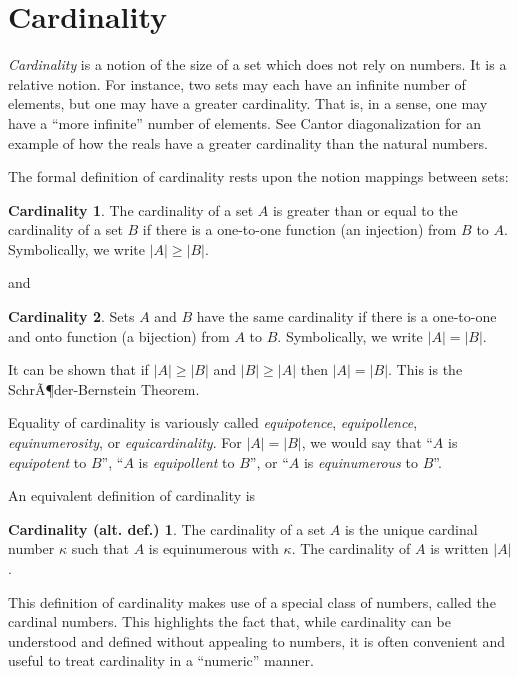 \documentclass[12pt]{article}
\theoremstyle{definition}
\newtheorem*{defn}{Cardinality}
\newtheorem*{altdefn}{Cardinality (alt. def.)}
\begin{document}
\section*{Cardinality}

\emph{Cardinality} is a notion of the size of a set which does not rely on numbers.  It is a relative notion.  For instance, two sets may each have an infinite number of elements, but one may have a greater cardinality.  That is, in a sense, one may have a ``more infinite'' number of elements.  See Cantor diagonalization for an example of how the reals have a greater cardinality than the natural numbers.

The formal definition of cardinality rests upon the notion mappings between sets:

\begin{defn}
The cardinality of a set $A$ is greater than or equal to 
the cardinality of a set $B$
if there is a one-to-one function (an injection) from $B$ to $A$.
Symbolically, we write $|A| \geq |B|$.
\end{defn}

and

\begin{defn}
Sets $A$ and $B$ have the same cardinality
if there is a one-to-one and onto function (a bijection) from $A$ to $B$.
Symbolically, we write $|A| = |B|$.
\end{defn}

It can be shown that if $|A| \geq |B|$ and $|B| \geq |A|$ then $|A| = |B|$.
This is the SchrÃ¶der-Bernstein Theorem.

Equality of cardinality is variously called \emph{equipotence}, \emph{equipollence}, \emph{equinumerosity}, or \emph{equicardinality}.
For $|A| = |B|$, we would say that ``$A$ is \emph{equipotent} to $B$'',
``$A$ is \emph{equipollent} to $B$'', or ``$A$ is \emph{equinumerous} to $B$''.

An equivalent definition of cardinality is

\begin{altdefn}
The cardinality of a set $A$ is the unique cardinal number $\kappa$ such that $A$ is equinumerous with $\kappa$. The cardinality of $A$ is written $|A|$.
\end{altdefn}

This definition of cardinality makes use of a special class of numbers, called the cardinal numbers. This highlights the fact that, while cardinality can be understood and defined without appealing to numbers, it is often convenient and useful to treat cardinality in a ``numeric'' manner.
\end{document}
